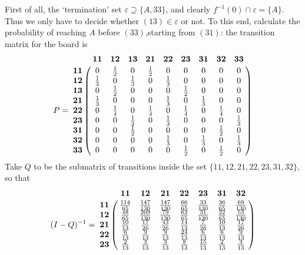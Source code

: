 \documentclass[aps,prl,twocolumn,floatfix,letterpaper]{revtex4}
\newenvironment{solution}[1][Solution]{\begin{trivlist}
    \item[\hskip \labelsep {\bfseries #1}]}{\end{trivlist}}
\begin{document}
\begin{solution}
First of all, the `termination' set $\varepsilon \supseteq \{ A, 33 \} $, and clearly 
$ f^{-1}(0) \cap \varepsilon = \{A\} $. 
Thus we only have to decide whether $(13) \in \varepsilon$ or not.
To this end, calculate the probability of reaching $A$ before $(33)$,starting from $(31)$: 
the transition matrix for the board is
\small
\begin{equation}
 P = 
 \bordermatrix{
	& \mathbf{11} & \mathbf{12} & \mathbf{13} & \mathbf{21} & \mathbf{22} & \mathbf{23} & \mathbf{31} & \mathbf{32} & \mathbf{33} \cr
\mathbf{11} & 	0	& \frac{1}{2}	& 0 	& \frac{1}{2} & 0 & 0 & 0 & 0 & 0	\cr
\mathbf{12} & \frac{1}{3} & 0 & \frac{1}{3} & 0 & \frac{1}{3} & 0 & 0 & 0 & 0		\cr
\mathbf{13} & 0 & \frac{1}{2} & 0 & 0 & 0 & \frac{1}{2} & 0 & 0 & 0			\cr
\mathbf{21} & \frac{1}{3} & 0 & 0 & 0 & \frac{1}{3} & 0 & \frac{1}{3} & 0 & 0		\cr
\mathbf{22} & 0 & \frac{1}{4} & 0 & \frac{1}{4} & 0 & \frac{1}{4} & 0 & \frac{1}{4} & 0 \cr
\mathbf{23} & 0 & 0 & \frac{1}{3} & 0 & \frac{1}{3} & 0 & 0 & 0 & \frac{1}{3}		\cr
\mathbf{31} & 0 & 0 & \frac{1}{2} & 0 & 0 & 0 & 0 & \frac{1}{2} & 0			\cr
\mathbf{32} & 0 & 0 & 0 & 0 & \frac{1}{3} & 0 & \frac{1}{3} & 0 & \frac{1}{3}		\cr
\mathbf{33} & 0 & 0 & 0 & 0 & 0 & \frac{1}{2} & 0 & \frac{1}{2} & 0
 }
\end{equation}
\normalsize
Take $Q$ to be the submatrix of transitions inside the set $\{11,12,21,22,23,31,32\}$, so that
\scriptsize
\begin{equation}
 (I-Q)^{-1} = 
 \bordermatrix{
& \mathbf{11} & \mathbf{12} & \mathbf{21} & \mathbf{22} & \mathbf{23} & \mathbf{31} & \mathbf{32} \cr
\mathbf{11} & \frac{114}{65} & \frac{147}{130} & \frac{147}{130} & \frac{66}{65} & \frac{33}{130} & \frac{36}{65} & \frac{69}{130}\cr
\mathbf{12} & \frac{48}{65} & \frac{209}{130} & \frac{79}{130} & \frac{62}{65} & \frac{31}{130} & \frac{22}{65} & \frac{53}{130}\cr 
\mathbf{21} &\frac{10}{13} & \frac{17}{26} & \frac{43}{26} & \frac{14}{13} & \frac{7}{26} & \frac{10}{13} & \frac{17}{26}\cr 
\mathbf{22} & \frac{6}{13} & \frac{9}{13} & \frac{9}{13} & \frac{24}{13} & \frac{6}{13} & \frac{6}{13} & \frac{9}{13}\cr
\mathbf{23} & \frac{2}{13} & \frac{3}{13} & \frac{3}{13} & \frac{8}{13} & \frac{15}{13} & \frac{2}{13} & \frac{3}{13}\cr
}
\end{equation}
\end{solution}
\end{document}
